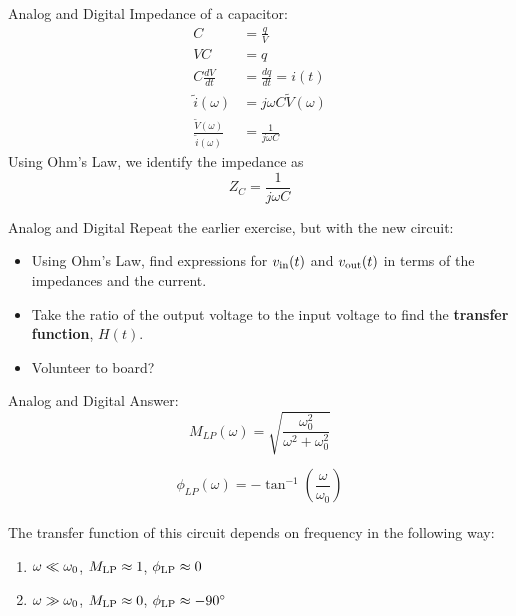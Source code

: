 \documentclass{beamer}
\begin{document}
\begin{frame}{Analog and Digital}
Impedance of a capacitor:
\begin{align}
C &= \frac{q}{V} \\
VC &= q \\
C \frac{dV}{dt} &= \frac{dq}{dt} = i(t) \\
\tilde{i}(\omega) &= j\omega C \tilde{V}(\omega) \\
\frac{\tilde{V}(\omega)}{\tilde{i}(\omega)} &= \frac{1}{j\omega C}
\end{align}
Using Ohm's Law, we identify the impedance as
\begin{equation}
\boxed{
Z_C = \frac{1}{j\omega C}
}
\label{eq:eq5}
\end{equation}
\end{frame}

\begin{frame}{Analog and Digital}
Repeat the earlier exercise, but with the new circuit:
\begin{itemize}
\item Using Ohm's Law, find expressions for $v_{\rm in}(t)$ and $v_{\rm out}(t)$ in terms of the impedances and the current.
\item Take the ratio of the output voltage to the input voltage to find the \textbf{transfer function}, $H(t)$.
\item Volunteer to board?
\end{itemize}
\end{frame}

\begin{frame}{Analog and Digital}
Answer:
\begin{equation}
\boxed{
M_{LP}(\omega) = \sqrt{\frac{\omega_0^2}{\omega^2+\omega_0^2}}
}
\label{eq:eq6}
\end{equation}

\begin{equation}
\boxed{
\phi_{LP}(\omega) = -\tan^{-1}\left(\frac{\omega}{\omega_0}\right)
}
\label{eq:eq7}
\end{equation} \\
\vspace{0.5cm}
The transfer function of this circuit depends on frequency in the following way:
\begin{enumerate}
\item $\omega \ll \omega_{\rm 0}$, $M_{\rm LP} \approx 1$, $\phi_{\rm LP} \approx 0$
\item $\omega \gg \omega_{\rm 0}$, $M_{\rm LP} \approx 0$, $\phi_{\rm LP} \approx -90^{\circ}$
\end{enumerate}
\end{frame}
\end{document}
